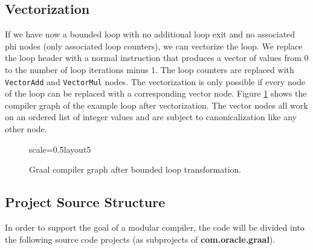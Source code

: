 \documentclass[twocolumn]{svjour3}
\begin{document}
\subsection{Vectorization}

If we have now a bounded loop with no additional loop exit and no associated phi nodes (only associated loop counters), we can vectorize the loop.
We replace the loop header with a normal instruction that produces a vector of values from 0 to the number of loop iterations minus 1.
The loop counters are replaced with \texttt{VectorAdd} and \texttt{VectorMul} nodes.
The vectorization is only possible if every node of the loop can be replaced with a corresponding vector node.
Figure \ref{fig:loop5} shows the compiler graph of the example loop after vectorization.
The vector nodes all work on an ordered list of integer values and are subject to canonicalization like any other node.


\begin{figure}[h]
  \label{fig:loop5}
  \centering
\begin{digraphenv}{scale=0.5}{layout5}
\end{digraphenv}
  \caption{Graal compiler graph after bounded loop transformation.}
\end{figure}

\subsection{Project Source Structure}
In order to support the goal of a modular compiler, the code will be divided into the following source code projects (as subprojects of \textbf{com.oracle.graal}).
\end{document}
